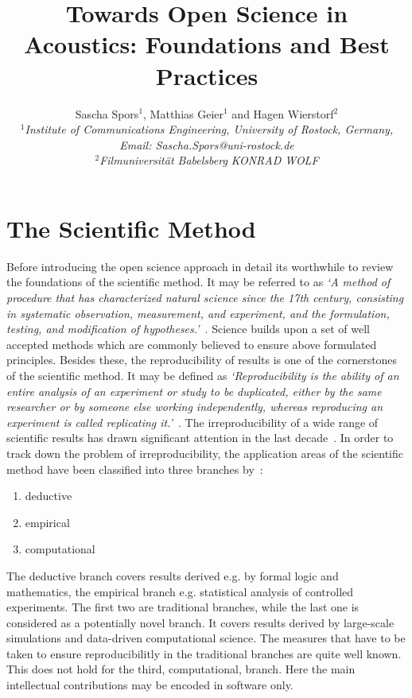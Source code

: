 \documentclass[a4paper, 10pt, twocolumn]{article}
\date{}                                         %
\title{\vspace{-8mm}\textbf{\large
Towards Open Science in Acoustics: Foundations and Best Practices}}
\author{
Sascha Spors$^1$, Matthias Geier$^1$ and Hagen Wierstorf$^2$\\
$^1$\emph{\small Institute of Communications Engineering, University of Rostock, Germany, Email: Sascha.Spors@uni-rostock.de}\\
$^2$\emph{\small Filmuniversität Babelsberg KONRAD WOLF}}
\begin{document}
\maketitle
\thispagestyle{empty}           %

\section*{The Scientific Method} \label{sec:intro} 

Before introducing the open science approach in detail its worthwhile to review the
foundations of the scientific method. It may be referred to  as 
\emph{`A method of procedure that has characterized natural science since the 17th 
century, consisting in systematic observation, measurement, and experiment, and the 
formulation, testing, and modification of hypotheses.'}~\cite{scientific_method:OXD}. 
Science builds upon a set of well accepted methods which are commonly believed to
ensure above formulated principles. Besides these, the reproducibility of results is 
one of the cornerstones of the scientific method. 
It may be defined as \emph{`Reproducibility is the ability of an entire analysis of 
an experiment or study to be duplicated, either by the same researcher or by someone 
else working independently, whereas reproducing an experiment is called replicating 
it.'}~\cite{Leek15:PNAS}. 
The irreproducibility of a wide range of scientific results has drawn significant 
attention in the last decade~\cite{Borgwardt:Book,retraction:WWW,ioannidis05:PLOS, open15:AAAS, chalmers09:OG, freedman15:PLOS, howells14:Nature}. 
In order to track down the problem of irreproducibility, the application areas of 
the scientific method have been classified into three branches by~\cite{Donoho:CSE,Stodden2014:talk}:
\begin{enumerate}
\item deductive
\item empirical
\item computational
\end{enumerate}
The deductive branch covers results derived e.g. by formal logic and mathematics, the empirical
branch e.g. statistical analysis of controlled experiments. The first two are traditional branches, 
while the last one is considered as a potentially novel branch. It covers results derived by large-scale simulations
and data-driven computational science. The measures that have to be taken to ensure reproducibilitly
in the traditional branches are quite well known. This does not hold for the third, computational, branch. Here
the main intellectual contributions may be encoded in software only.
\end{document}
